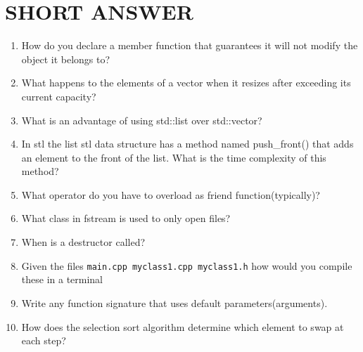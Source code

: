 \documentclass[a4paper]{article}
\begin{document}
\section{SHORT ANSWER}
\begin{enumerate}
    \item How do you declare a member function that guarantees it will not modify the object it belongs to?
    \item What happens to the elements of a vector when it resizes after exceeding its current capacity?
    \item What is an advantage of using std::list over std::vector?
    \item In stl the list stl data structure has a method named push\_front() 
          that adds an element to the front of the list. What is the time complexity of this method?
    \item What operator do you have to overload as friend function(typically)?
    \item What class in fstream is used to only open files?
    \item When is a destructor called?
    \item Given the files \texttt{main.cpp myclass1.cpp myclass1.h} how would you compile these in a terminal
    \item Write any function signature that uses default parameters(arguments).
    \item How does the selection sort algorithm determine which element to swap at each step?  
\end{enumerate}
\newpage 
\end{document}
